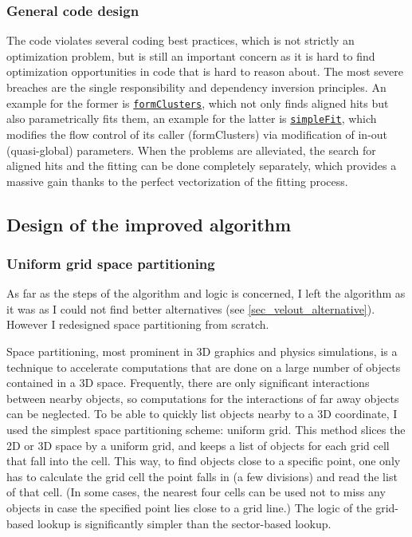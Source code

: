 \documentclass[12pt]{article}
\newcommand{\code}[1]{\texttt{#1}}
\begin{document}
\subsubsection{General code design}

The code violates several coding best practices, which is not strictly an optimization problem, but is still an important concern as it is hard to find optimization opportunities in code that is hard to reason about. The most severe breaches are the single responsibility and dependency inversion principles. An example for the former is \href{https://gitlab.cern.ch/lhcb/Rec/blob/1b7edc5aea96f2225601238b3f64e478e41b6c70/Pr/PrVeloUT/src/PrVeloUT.cpp#L337}{\code{formClusters}}, which not only finds aligned hits but also parametrically fits them, an example for the latter is \href{https://gitlab.cern.ch/lhcb/Rec/blob/1b7edc5aea96f2225601238b3f64e478e41b6c70/Pr/PrVeloUT/src/PrVeloUT.h#L191}{\code{simpleFit}}, which modifies the flow control of its caller (formClusters) via modification of in-out (quasi-global) parameters. When the problems are alleviated, the search for aligned hits and the fitting can be done completely separately, which provides a massive gain thanks to the perfect vectorization of the fitting process.


\subsection{Design of the improved algorithm}

\subsubsection{Uniform grid space partitioning}\label{sec_velout_space_partitioning}

As far as the steps of the algorithm and logic is concerned, I left the algorithm as it was as I could not find better alternatives (see \ref{sec_velout_alternative}). However I redesigned space partitioning from scratch.
\vspace{1pc}

Space partitioning, most prominent in 3D graphics and physics simulations, is a technique to accelerate computations that are done on a large number of objects contained in a 3D space. Frequently, there are only significant interactions between nearby objects, so computations for the interactions of far away objects can be neglected. To be able to quickly list objects nearby to a 3D coordinate, I used the simplest space partitioning scheme: uniform grid. This method slices the 2D or 3D space by a uniform grid, and keeps a list of objects for each grid cell that fall into the cell. This way, to find objects close to a specific point, one only has to calculate the grid cell the point falls in (a few divisions) and read the list of that cell. (In some cases, the nearest four cells can be used not to miss any objects in case the specified point lies close to a grid line.) The logic of the grid-based lookup is significantly simpler than the sector-based lookup.
\vspace{1pc}
\end{document}
